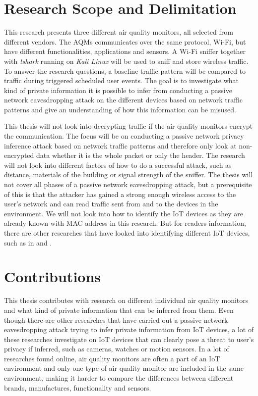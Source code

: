 \section{Research Scope and Delimitation}
This research presents three different air quality monitors, all selected from different vendors. The \gls{AQM}s communicates over the same protocol, \gls{Wi-Fi}, but have different functionalities, applications and sensors. A \gls{Wi-Fi} sniffer together with \textit{tshark} running on \textit{Kali Linux} will be used to sniff and store wireless traffic. To answer the research questions, a baseline traffic pattern will be compared to traffic during triggered scheduled user events. The goal is to investigate what kind of private information it is possible to infer from conducting a passive network eavesdropping attack on the different devices based on network traffic patterns and give an understanding of how this information can be misused. 

This thesis will not look into decrypting traffic if the air quality monitors encrypt the communication. The focus will be on conducting a passive network privacy inference attack based on network traffic patterns and therefore only look at non-encrypted data whether it is the whole packet or only the header. The research will not look into different factors of how to do a successful attack, such as distance, materials of the building or signal strength of the sniffer. The thesis will not cover all phases of a passive network eavesdropping attack, but a prerequisite of this is that the attacker has gained a strong enough wireless access to the user's network and can read traffic sent from and to the devices in the environment. We will not look into how to identify the \gls{IoT} devices as they are already known with \gls{MAC} address in this research. But for readers information, there are other researches that have looked into identifying different \gls{IoT} devices, such as in \cite{IdentifyIoT1} and \cite{IdentifyingIoT2}. 

\section{Contributions}
This thesis contributes with research on different individual air quality monitors and what kind of private information that can be inferred from them. Even though there are other researches that have carried out a passive network eavesdropping attack trying to infer private information from \gls{IoT} devices, a lot of these researches investigate on \gls{IoT} devices that can clearly pose a threat to user's privacy if inferred, such as cameras, watches or motion sensors. In a lot of researches found online, air quality monitors are often a part of an \gls{IoT} environment and only one type of air quality monitor are included in the same environment, making it harder to compare the differences between different brands, manufactures, functionality and sensors. 

